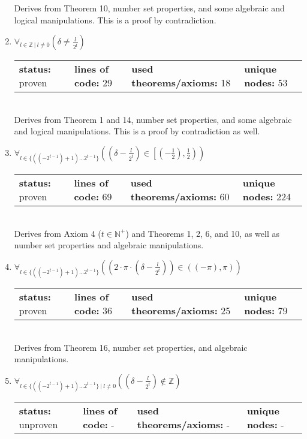 \documentclass{article}[12pt]
\begin{document}
\begin{enumerate}
Derives from Theorem 10, number set properties, and some algebraic and logical manipulations.  This is a proof by contradiction.
\item $\forall_{l \in \mathbb{Z}~|~l \neq 0} \left(\delta \neq \frac{l}{2^{t}}\right)$ \hfill \\
  \begin{tabular}{l | l | l | l}
    \textbf{status:} proven & \textbf{lines of code:} 29 & \textbf{used theorems/axioms:} 18 & \textbf{unique nodes:} 53
  \end{tabular} \hfill \\
Derives from Theorem 1 and 14, number set properties, and some algebraic and logical manipulations.  This is a proof by contradiction as well.
\item $\forall_{l \in \{\left(\left(-2^{t - 1}\right) + 1\right)\ldots 2^{t - 1}\}} \left(\left(\delta - \frac{l}{2^{t}}\right) \in \left[\left(-\frac{1}{2}\right),\frac{1}{2}\right)\right)$ \hfill \\
  \begin{tabular}{l | l | l | l}
    \textbf{status:} proven & \textbf{lines of code:} 69 & \textbf{used theorems/axioms:} 60 & \textbf{unique nodes:} 224
  \end{tabular} \hfill \\
Derives from Axiom 4 ($t \in \mathbb{N}^+$) and Theorems 1, 2, 6, and 10, as well as number set properties and algebraic manipulations. 
\item $\forall_{l \in \{\left(\left(-2^{t - 1}\right) + 1\right)\ldots 2^{t - 1}\}} \left(\left(2 \cdot \pi \cdot \left(\delta - \frac{l}{2^{t}}\right)\right) \in \left(\left(-\pi\right),\pi\right)\right)$ \hfill \\
  \begin{tabular}{l | l | l | l}
    \textbf{status:} proven & \textbf{lines of code:} 36 & \textbf{used theorems/axioms:} 25 & \textbf{unique nodes:} 79
  \end{tabular} \hfill \\
Derives from Theorem 16, number set properties, and algebraic manipulations.
\item $\forall_{l \in \{\left(\left(-2^{t - 1}\right) + 1\right)\ldots 2^{t - 1}\}~|~l \neq 0} \left(\left(\delta - \frac{l}{2^{t}}\right) \notin \mathbb{Z}\right)$ \hfill \\
  \begin{tabular}{l | l | l | l}
    \textbf{status:} unproven & \textbf{lines of code:} - & \textbf{used theorems/axioms:} - & \textbf{unique nodes:} -
  \end{tabular} \hfill \\

\end{enumerate}
\end{document}
